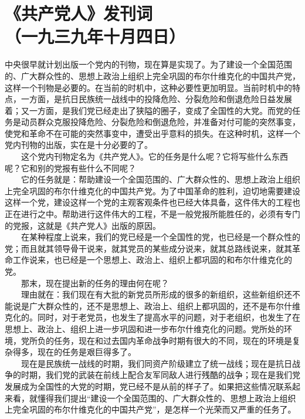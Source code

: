 \documentclass[cn,11pt,chinese]{elegantbook}
\def\myformat#1{\hfil\hfil #1}
\begin{document}
\newpage\section*{\myformat{《共产党人》发刊词}\\\myformat{（一九三九年十月四日）}}
中央很早就计划出版一个党内的刊物，现在算是实现了。为了建设一个全国范围的、广大群众性的、思想上政治上组织上完全巩固的布尔什维克化的中国共产党，这样一个刊物是必要的。在当前的时机中，这种必要性更加明显。当前时机中的特点，一方面，是抗日民族统一战线中的投降危险、分裂危险和倒退危险日益发展着；又一方面，是我们党已经走出了狭隘的圈子，变成了全国性的大党。而党的任务是动员群众克服投降危险、分裂危险和倒退危险，并准备对付可能的突然事变，使党和革命不在可能的突然事变中，遭受出乎意料的损失。在这种时机，这样一个党内刊物的出版，实在是十分必要的了。\\
　　这个党内刊物定名为《共产党人》。它的任务是什么呢？它将写些什么东西呢？它和别的党报有些什么不同呢？\\
　　它的任务就是：帮助建设一个全国范围的、广大群众性的、思想上政治上组织上完全巩固的布尔什维克化的中国共产党。为了中国革命的胜利，迫切地需要建设这样一个党，建设这样一个党的主观客观条件也已经大体具备，这件伟大的工程也正在进行之中。帮助进行这件伟大的工程，不是一般党报所能胜任的，必须有专门的党报，这就是《共产党人》出版的原因。\\
　　在某种程度上说来，我们的党已经是一个全国性的党，也已经是一个群众性的党；而且就其领导骨干说来，就其党员的某些成分说来，就其总路线说来，就其革命工作说来，也已经是一个思想上、政治上、组织上都巩固的和布尔什维克化的党。\\
　　那末，现在提出新的任务的理由何在呢？\\
　　理由就在：我们现在有大批的新党员所形成的很多的新组织，这些新组织还不能说是广大群众性的，还不是思想上、政治上、组织上都巩固的，还不是布尔什维克化的。同时，对于老党员，也发生了提高水平的问题，对于老组织，也发生了在思想上、政治上、组织上进一步巩固和进一步布尔什维克化的问题。党所处的环境，党所负的任务，现在和过去国内革命战争时期有很大的不同，现在的环境是复杂得多，现在的任务是艰巨得多了。\\
　　现在是民族统一战线的时期，我们同资产阶级建立了统一战线；现在是抗日战争的时期，我们党的武装在前线上配合友军同敌人进行残酷的战争；现在是我们党发展成为全国性的大党的时期，党已经不是从前的样子了。如果把这些情况联系起来看，就懂得我们提出“建设一个全国范围的、广大群众性的、思想上政治上组织上完全巩固的布尔什维克化的中国共产党”，是怎样一个光荣而又严重的任务了。\\
\end{document}
